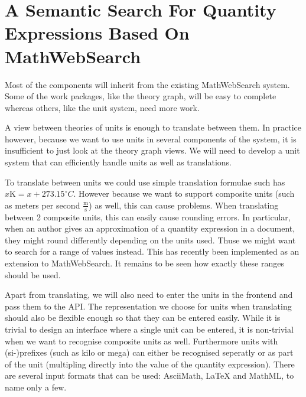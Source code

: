 \documentclass[11pt]{article}
\begin{document}
\section{A Semantic Search For Quantity Expressions Based On MathWebSearch}
\label{sec:system}

Most of the components will inherit from the existing MathWebSearch system. Some of the work packages, like the theory graph, will be easy to complete whereas others, like the unit system, need more work.

A view between theories of units is enough to translate between them. In practice however, because we want to use units in several components of the system, it is insufficient to just look at the theory graph views. We will need to develop a unit system that can efficiently handle units as well as translations.

To translate between units we could use simple translation formulae such has $x \text{K} = x + 273.15 ^\circ{C} $. However because we want to support composite units (such as meters per second $\frac{\text{m}}{\text{s}}$) as well, this can cause problems. When translating between 2 composite units, this can easily cause rounding errors. In particular, when an author gives an approximation of a quantity expression in a document, they might round differently depending on the units used. Thuse we might want to search for a range of values instead. This has recently been implemented as an extension to MathWebSearch\cite{MWS:Ranges}. It remains to be seen how exactly these ranges should be used.

Apart from translating, we will also need to enter the units in the frontend and pass them to the API. The representation we choose for units when translating should also be flexible enough so that they can be entered easily. While it is trivial to design an interface where a single unit can be entered, it is non-trivial when we want to recognise composite units as well. Furthermore units with (si-)prefixes (such as kilo or mega) can either be recognised seperatly or as part of the unit (multipling directly into the value of the quantity expression). There are several input formats that can be used: AsciiMath, \LaTeX{} and MathML, to name only a few.

{}
\end{document}
